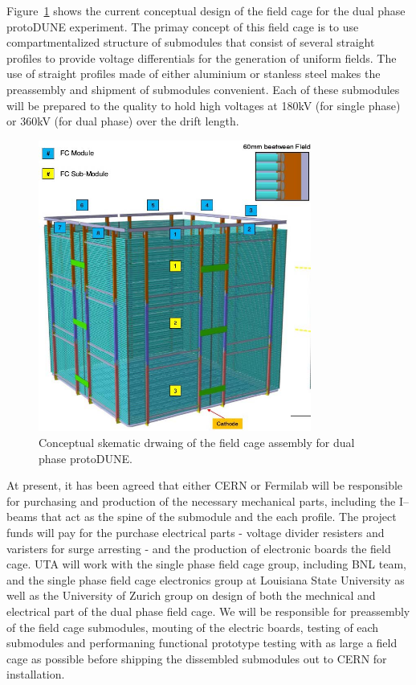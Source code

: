 Figure~\ref{fig:if-dp-fc} shows the current conceptual design of the field cage for the dual phase protoDUNE experiment.   The primay concept of this field cage is to use compartmentalized structure of submodules that consist of several straight profiles to provide voltage differentials for the generation of uniform fields.   The use of straight profiles made of either aluminium or stanless steel makes the preassembly and shipment of submodules convenient.   Each of these submodules will be prepared to the quality to hold high voltages at 180kV (for single phase) or  360kV (for dual phase) over the drift length.  
\begin{figure}[htb]
\centering
\includegraphics[width=0.80\textwidth]{images/if-dp-fc.jpg}
\caption[]{Conceptual skematic drwaing of the field cage assembly for dual phase protoDUNE.}
\label{fig:if-dp-fc}
\end{figure}

At present, it has been agreed that either CERN or Fermilab will be responsible for purchasing and production of the necessary mechanical parts, including the I--beams that act as the spine of the submodule and the each profile.  The project funds will pay for the purchase electrical parts - voltage divider resisters and varisters for surge arresting - and the production of electronic boards the field cage.  UTA will work with the single phase field cage group, including BNL team, and the single phase field cage electronics group at Louisiana State University as well as the University of Zurich group on design of both the mechnical and electrical part of the dual phase field cage.   We will be responsible for preassembly of the field cage submodules, mouting of the electric boards, testing of each submodules and performaning functional prototype testing with as large a field cage as possible before shipping the dissembled submodules out to CERN for installation.

